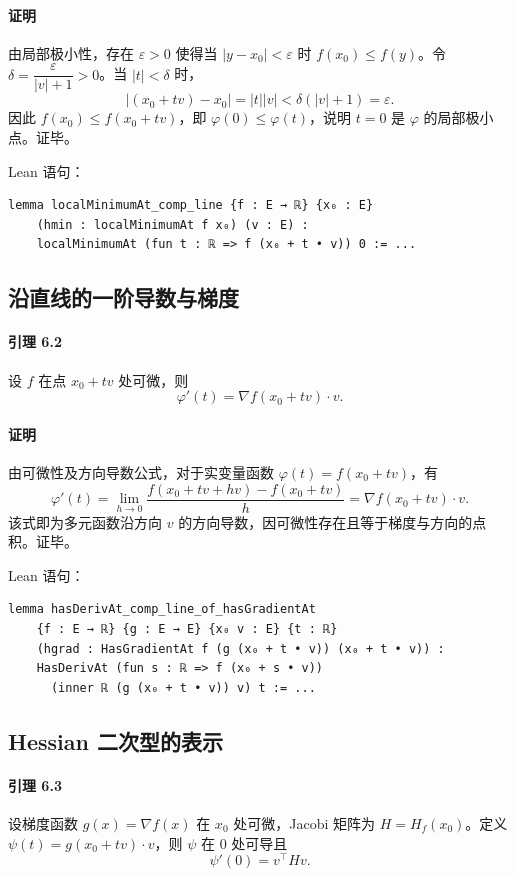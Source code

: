 ﻿\documentclass[UTF8,a4paper,zihao=-4]{ctexart}
\begin{document}
\paragraph{证明}由局部极小性，存在 \(\varepsilon>0\) 使得当 \(|y-x_0|<\varepsilon\) 时 \(f(x_0)\le f(y)\)。令 \(\delta=\dfrac{\varepsilon}{|v|+1}>0\)。当 \(|t|<\delta\) 时，
\[
|(x_0+tv)-x_0| = |t||v| < \delta(|v|+1) = \varepsilon.
\]
因此 \(f(x_0)\le f(x_0+tv)\)，即 \(\varphi(0)\le\varphi(t)\)，说明 \(t=0\) 是 \(\varphi\) 的局部极小点。证毕。

Lean 语句：
\begin{verbatim}
lemma localMinimumAt_comp_line {f : E → ℝ} {x₀ : E}
    (hmin : localMinimumAt f x₀) (v : E) :
    localMinimumAt (fun t : ℝ => f (x₀ + t • v)) 0 := ...
\end{verbatim}

\subsection{沿直线的一阶导数与梯度}
\paragraph{引理 6.2}设 \(f\) 在点 \(x_0+tv\) 处可微，则
\[
\varphi'(t)=\nabla f(x_0+tv)\cdot v.
\]
\paragraph{证明}由可微性及方向导数公式，对于实变量函数 \(\varphi(t)=f(x_0+tv)\)，有
\[
\varphi'(t) = \lim_{h\to0}\frac{f(x_0+tv+hv)-f(x_0+tv)}{h}
= \nabla f(x_0+tv)\cdot v.
\]
该式即为多元函数沿方向 \(v\) 的方向导数，因可微性存在且等于梯度与方向的点积。证毕。

Lean 语句：
\begin{verbatim}
lemma hasDerivAt_comp_line_of_hasGradientAt
    {f : E → ℝ} {g : E → E} {x₀ v : E} {t : ℝ}
    (hgrad : HasGradientAt f (g (x₀ + t • v)) (x₀ + t • v)) :
    HasDerivAt (fun s : ℝ => f (x₀ + s • v))
      (inner ℝ (g (x₀ + t • v)) v) t := ...
\end{verbatim}

\subsection{Hessian 二次型的表示}
\paragraph{引理 6.3}设梯度函数 \(g(x)=\nabla f(x)\) 在 \(x_0\) 处可微，Jacobi 矩阵为 \(H=H_f(x_0)\)。定义 \(\psi(t)=g(x_0+tv)\cdot v\)，则 \(\psi\) 在 \(0\) 处可导且
\[
\psi'(0)=v^{\top}Hv.
\]
\end{document}
